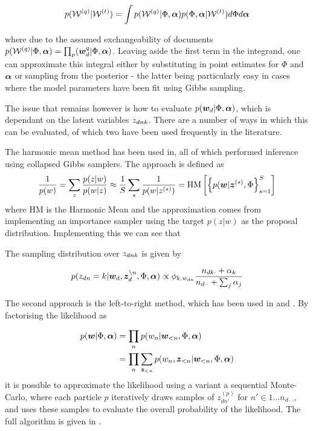 \begin{align}
p(\mathcal{W}^{(q)}|\mathcal{W}^{(t)}) = \int p(\mathcal{W}^{(q)}|\Phi, \bm \alpha)p(\Phi,\bm \alpha | \mathcal{W}^{(t)}) d\Phi d\bm \alpha
\end{align}

where due to the assumed exchangeability of documents $p(\mathcal{W}^{(q)}|\Phi, \bm \alpha) = \prod_ p(\bm w_d^{q}|\Phi, \bm \alpha)$. Leaving aside the first term in the integrand, one can approximate this integral either by substituting in point estimates for $\Phi$ and $\bm \alpha$ or sampling from the posterior - the latter being particularly easy in cases where the model parameters have been fit using Gibbs sampling.

The issue that remains however is how to evaluate $p(\bm w_d|\Phi, \bm \alpha)$, which is dependant on the latent variables ${ z_{dnk} }$. There are a number of ways in which this can be evaluated, of which two have been used frequently in the literature.

The harmonic mean method has been used in\cite{Griffiths2004}\cite{Griffiths2005}\cite{Wallach2006}, all of which performed inference using collapsed Gibbs samplers. The approach is defined as
\begin{align}
\frac{1}{ {p(w)} } = \sum_z \frac{p(z|w)}{p(w|z)} \approx \frac{1}{ {S} } \sum_s \frac{1}{ {p(w|{ z }^{(s)})} }
=  \text{HM}\left[ \left\{ p(\bm w|{ \bm z }^{(s)}, \Phi \right\}_{s=1}^{S}  \right]
\end{align}
where HM is the Harmonic Mean and the approximation comes from implementing an importance sampler using the target $p(z|w)$ as the proposal distribution. Implementing this we can see that 

The sampling distribution over ${ z_{dnk} }$ is given by

\begin{align}
p(z_{dn} = k | \bm w_d, \bm z_d^{\setminus n}, \Phi, \bm \alpha) \propto \phi_{k,{w_{dn}}}\frac{n_{dk\cdot} + \alpha_k}{n_{d\cdot\cdot} + \sum_j \alpha_j}
\end{align}

The second approach is the left-to-right method, which has been used in \cite{Mimno2011} and \cite{Mimno2012a}. By factorising the likelihood as

\begin{align}
p(\bm w|\Phi, \bm \alpha) & = \prod_n p(w_n | \bm w_{<n}, \Phi, \bm \alpha) \\
& = \prod_n \sum_{\bm z_{<n}} p(w_n, \bm z_{<n}| \bm w_{<n}, \Phi, \bm \alpha)
\end{align}
it is possible to approximate the likelihood using a variant a sequential Monte-Carlo, where each particle $p$ iteratively draws samples of $z^{(p)}_{dn'}$ for $n' \in 1 \ldots n_{d\cdot\cdot}$, and uses these samples to evaluate the overall probability of the likelihood. The full algorithm is given in \cite{Wallach2009}.


